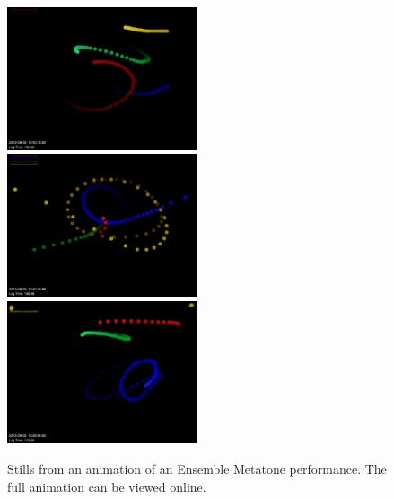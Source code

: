 \documentclass[graybox]{svmult}
\begin{document}

\begin{figure}
  \centering
  \includegraphics[width=0.5\textwidth]{figures/metatoneanimation1}
  \includegraphics[width=0.5\textwidth]{figures/metatoneanimation3}
  \includegraphics[width=0.5\textwidth]{figures/metatoneanimation2}
   \caption{Stills from an animation of an Ensemble Metatone
     performance. The full animation can be viewed online.}
  \label{metatoneanimation3}
\end{figure}
\end{document}

